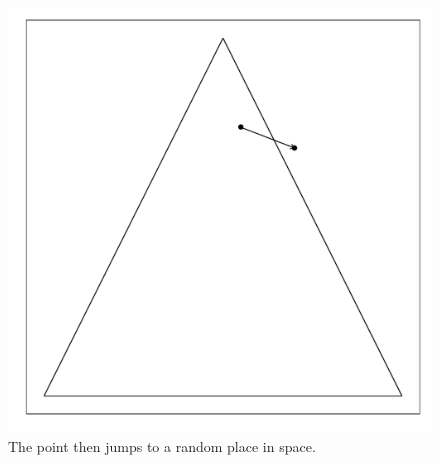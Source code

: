 \documentclass{article}\usepackage{graphicx, color}
\makeatletter
\def\maxwidth{ %
  \ifdim\Gin@nat@width>\linewidth
    \linewidth
  \else
    \Gin@nat@width
  \fi
}
\newenvironment{knitrout}{}{} %
\makeatother
\begin{document}
\begin{figure}[H]
\begin{knitrout}
\color{fgcolor}
\includegraphics[width=\maxwidth]{figure/mirror_walkthrough2} 

\end{knitrout}

\caption{The point then jumps to a random place in space.}
\end{figure}
\end{document}

